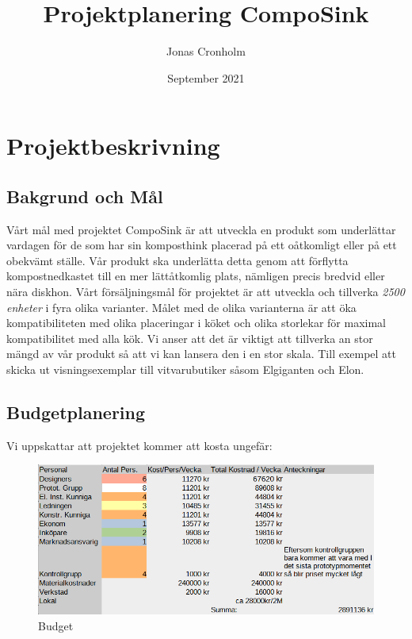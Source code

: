 \documentclass{article}
\title{Projektplanering CompoSink}
\author{Jonas Cronholm}
\date{September 2021}
\begin{document}
	\maketitle
	\pagebreak
	\tableofcontents
	\pagebreak

	\section{Projektbeskrivning}
	\subsection{Bakgrund och Mål}
	Vårt mål med projektet CompoSink är att utveckla en produkt som underlättar vardagen för de som har sin komposthink placerad på ett oåtkomligt eller på ett obekvämt ställe. Vår produkt ska underlätta detta genom att förflytta kompostnedkastet till en mer lättåtkomlig plats, nämligen precis bredvid eller nära diskhon. Vårt försäljningsmål för projektet är att utveckla och tillverka \textit{2500 enheter} i fyra olika varianter. Målet med de olika varianterna är att öka kompatibiliteten med olika placeringar i köket och olika storlekar för maximal kompatibilitet med alla kök. Vi anser att det är viktigt att tillverka an stor mängd av vår produkt så att vi kan lansera den i en stor skala. Till exempel att skicka ut visningsexemplar till vitvarubutiker såsom Elgiganten och Elon.
	\subsection{Budgetplanering}
	Vi uppskattar att projektet kommer att kosta ungefär:	
	\begin{figure}[h]
		\includegraphics[width=\linewidth]{budget.png}
		\caption{Budget}
		\label{fig: BUDGET}
		\centering
	\end{figure}
\end{document}
